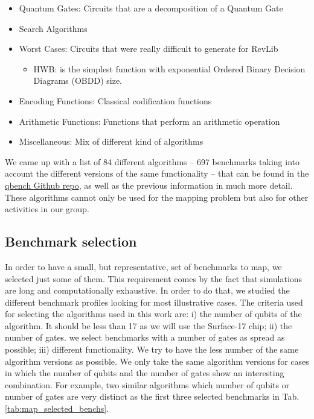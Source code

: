 \begin{itemize}
\item Quantum Gates: Circuits that are a decomposition of a Quantum Gate
\item Search Algorithms
\item Worst Cases: Circuits that were really difficult to generate for RevLib
\begin{itemize}
\item HWB: is the simplest function with exponential Ordered Binary Decision Diagrams (OBDD) size.
\end{itemize}
\item Encoding Functions: Classical codification functions
\item Arithmetic Functions: Functions that perform an arithmetic operation
\item Miscellaneous: Mix of different kind of algorithms
\end{itemize}

We came up with a list of 84 different algorithms -- 697 benchmarks taking into account the different versions of the same functionality -- that can be found in the \href{https://github.com/QE-Lab/qbench}{qbench Github repo}, as well as the previous information in much more detail.
These algorithms cannot only be used for the mapping problem but also for other activities in our group.

\subsection{Benchmark selection}
\label{sec:org80c681f}

In order to have a small, but representative, set of benchmarks to map, we selected just some of them.
This requirement comes by the fact that simulations are long and computationally exhaustive.
In order to do that, we studied the different benchmark profiles looking for most illustrative cases.
The criteria used for selecting the algorithms used in this work are: 
i) the number of qubits of the algorithm. It should be less than 17 as we will use the Surface-17 chip; ii) the number of gates.
we select benchmarks with a number of gates as spread as possible; iii) different functionality.
We try to have the less number of the same algorithm versions as possible.
We only take the same algorithm versions for cases in which the number of qubits and the number of gates show an interesting combination.
For example, two similar algorithms which number of qubits or number of gates are very distinct as the first three selected benchmarks in Tab. \ref{tab:map_selected_benchs}.


